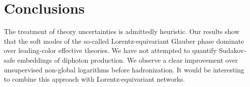 \section{Conclusions}\label{sec:conclusions}

The treatment of theory uncertainties is admittedly heuristic. Our
results show that the soft modes of the so-called Lorentz-equivariant
Glauber phase dominate over leading-color effective theories. We have
not attempted to quantify Sudakov-safe embeddings of diphoton
production. We observe a clear improvement over unsupervised non-global
logarithms before hadronization. It would be interesting to combine this
approach with Lorentz-equivariant networks.

